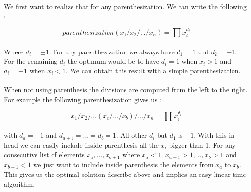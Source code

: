 
\paragraph{}
We first want to realize that for any parenthesization. We can write the following : 

\[parenthesization(x_1/x_2/.../x_n) = \prod x_i^{d_i}\]

\paragraph{}
Where $d_i = \pm 1$. For any parenthesization we always have $d_1 = 1$ and $d_2 = -1$. For the remaining $d_i$ the optimum would be to have $d_i = 1$ when $x_i > 1$ and $d_i = -1$ when $x_i < 1$. We can obtain this result with a simple parenthesization. 

\paragraph{}
When not using parenthesis the divisions are computed from the left to the right. For example the following parenthesization gives us : 

\[x_1/x_2/...(x_a/.../x_b)/.../x_n = \prod x_i^{d_i}\]

\paragraph{}
with $d_a = -1$ and $d_{a+1} = ... = d_b = 1$. All other $d_i$ but $d_1$ is $-1$. With this in head we can easily include inside parenthesis all the $x_i$ bigger than 1. For any consecutive list of elements $x_a,...,x_{b+1}$ where $x_a < 1$, $x_{a+1}>1,...,x_b>1$ and $x_{b+1}<1$ we just want to include inside parenthesis the elements from $x_a$ to $x_b$. This gives us the optimal solution describe above and implies an easy linear time algorithm.




